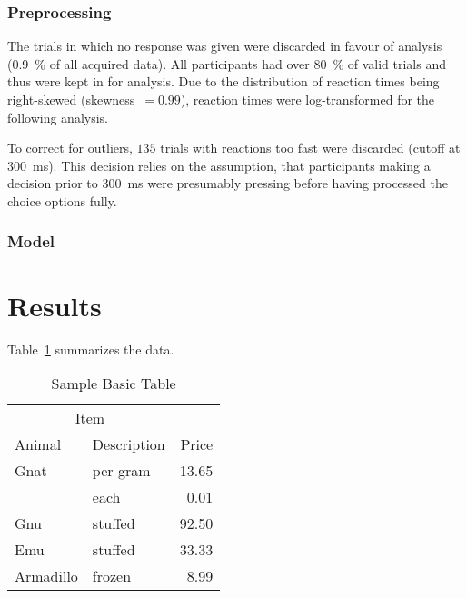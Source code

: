 			\subsubsection{Preprocessing}

			The trials in which no response was given were discarded in favour of analysis (\SI{0.9}{\percent} of all acquired data). All participants had over \SI{80}{\percent} of valid trials and thus were kept in for analysis.
			Due to the distribution of reaction times being right-skewed (skewness~$=0.99$), reaction times were log-transformed for the following analysis.
				
			To correct for outliers, $135$ trials with reactions too fast were discarded (cutoff at \SI{300}{\milli\second}). This decision relies on the assumption, that participants making a decision prior to \SI{300}{\milli\second} were presumably pressing before having processed the choice options fully.
			
			
				
			\subsubsection{Model}
				
		
		
		
		
		
		
		\section{Results}
		
		
		
		
		Table~\ref{tab:BasicTable} summarizes the data. 
		\lipsum[1]
		\begin{table}
			\caption{Sample Basic Table}
			\label{tab:BasicTable}
			\begin{tabular}{@{}llr@{}}         \toprule
				\multicolumn{2}{c}{Item}        \\ \cmidrule(r){1-2}
				Animal    & Description & Price \\ \midrule
				Gnat      & per gram    & 13.65 \\
				& each        &  0.01 \\
				Gnu       & stuffed     & 92.50 \\
				Emu       & stuffed     & 33.33 \\
				Armadillo & frozen      &  8.99 \\ \bottomrule
			\end{tabular}
		\end{table}
	
